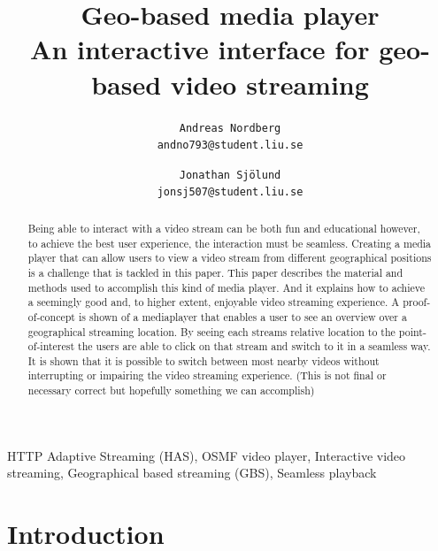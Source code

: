 \documentclass[9pt,a4paper]{acmproc}
\author{
\texttt{Andreas Nordberg}\\
\texttt{andno793@student.liu.se}
  \and
  \texttt{Jonathan Sjölund}\\
  \texttt{jonsj507@student.liu.se}
}
\begin{document}
\title{%
	Geo-based media player \\
	\large An interactive interface for geo-based video streaming}
\maketitle



\begin{abstract}
Being able to interact with a video stream can be both fun and educational however, to achieve the best user experience, the interaction must be seamless. Creating a media player that can allow users to view a video stream from different geographical positions is a challenge that is tackled in this paper. This paper describes the material and methods used to accomplish this kind of media player. And it explains how to achieve a seemingly good and, to higher extent, enjoyable video streaming experience. A proof-of-concept is shown of a mediaplayer that enables a user to see an overview over a geographical streaming location. By seeing each streams relative location to the point-of-interest the users are able to click on that stream and switch to it in a seamless way. It is shown that it is possible to switch between most nearby videos without interrupting or impairing the video streaming experience. (This is not final or necessary correct but hopefully something we can accomplish)

\end{abstract}

\begin{keywords}
HTTP Adaptive Streaming (HAS), OSMF video player, Interactive video streaming, Geographical based streaming (GBS), Seamless playback
\end{keywords}

\section{Introduction} 
\end{document}
